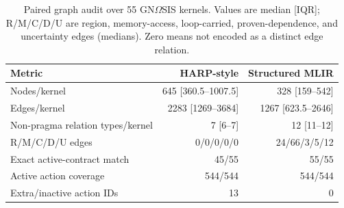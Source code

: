 \begin{table}[t]
  \centering
  \caption{Paired graph audit over 55 GN$\Omega$SIS kernels. Values are median [IQR]; R/M/C/D/U are region, memory-access, loop-carried, proven-dependence, and uncertainty edges (medians). Zero means not encoded as a distinct edge relation.}
  \label{tab:representation-audit}
  \small
  \begin{tabularx}{\columnwidth}{@{}Xrr@{}}
    \toprule
    Metric & HARP-style & Structured MLIR \\
    \midrule
    Nodes/kernel & 645 [360.5--1007.5] & 328 [159--542] \\
    Edges/kernel & 2283 [1269--3684] & 1267 [623.5--2646] \\
    Non-pragma relation types/kernel & 7 [6--7] & 12 [11--12] \\
    R/M/C/D/U edges & 0/0/0/0/0 & 24/66/3/5/12 \\
    \midrule
    Exact active-contract match & 45/55 & 55/55 \\ 
    Active action coverage & 544/544 & 544/544 \\ 
    Extra/inactive action IDs & 13 & 0 \\ 
    \bottomrule
  \end{tabularx}
\end{table}
